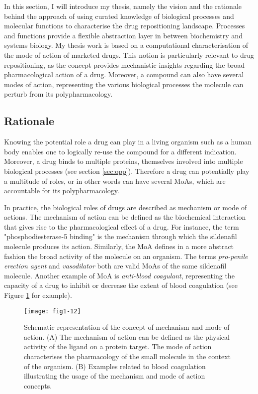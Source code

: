 In this section, I will introduce my thesis, namely the vision and the rationale behind the approach of using curated knowledge of biological processes and molecular functions to characterise the drug repositioning landscape. Processes and functions provide a flexible abstraction layer in between biochemistry and systems biology. My thesis work is based on a computational characterisation of the mode of action of marketed drugs. This notion is particularly relevant to drug repositioning, as the concept provides mechanistic insights regarding the broad pharmacological action of a drug. Moreover, a compound can also have several modes of action, representing the various biological processes the molecule can perturb from its polypharmacology.

\subsection{Rationale}

Knowing the potential role a drug can play in a living organism such as a human body enables one to logically re-use the compound for a different indication. Moreover, a drug binds to multiple proteins, themselves involved into multiple biological processes (see section \ref{sec:opp}). Therefore a drug can potentially play a multitude of roles, or in other words can have several MoAs, which are accountable for its polypharmacology.

In practice, the biological roles of drugs are described as mechanism or mode of actions. The mechanism of action can be defined as the biochemical interaction that gives rise to the pharmacological effect of a drug. For instance, the term "phosphodiesterase-5 binding" is the mechanism through which the sildenafil molecule produces its action. Similarly, the MoA defines in a more abstract fashion the broad activity of the molecule on an organism. The terms \emph{pro-penile erection agent} and \emph{vasodilator} both are valid MoAs of the same sildenafil molecule. Another example of MoA is \emph{anti-blood coagulant}, representing the capacity of a drug to inhibit or decrease the extent of blood coagulation (see Figure \ref{fig1-12} for example).

\begin{figure}[ht]
    \centering
    \texttt{[image: fig1-12]}
    \caption{Schematic representation of the concept of mechanism and mode of action. (A) The mechanism of action can be defined as the physical activity of the ligand on a protein target. The mode of action characterises the pharmacology of the small molecule in the context of the organism. (B) Examples related to blood coagulation illustrating the usage of the mechanism and mode of action concepts.}
    \label{fig1-12}
\end{figure}

